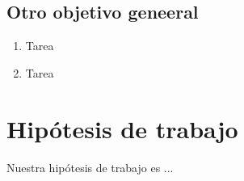\subsection{Otro objetivo geneeral}

  \begin{enumerate}

    \item Tarea
    
    \item Tarea

  \end{enumerate}




\section{Hipótesis de trabajo}\label{sec:hipotesis}

Nuestra hipótesis de trabajo es ... 
